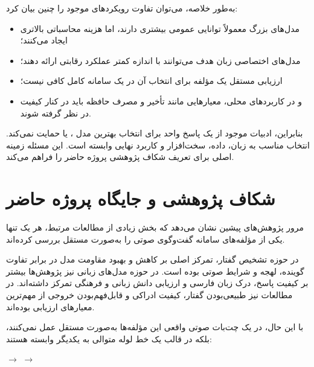به‌طور خلاصه، می‌توان تفاوت رویکردهای موجود را چنین بیان کرد:

\begin{itemize}

    \item مدل‌های بزرگ معمولاً توانایی عمومی بیشتری دارند،
    اما هزینه محاسباتی بالاتری ایجاد می‌کنند؛

    \item مدل‌های اختصاصی زبان هدف می‌توانند با اندازه کمتر
    عملکرد رقابتی ارائه دهند؛

    \item ارزیابی مستقل یک مؤلفه برای انتخاب آن در یک سامانه
    کامل کافی نیست؛

    \item و در کاربردهای محلی، معیارهایی مانند تأخیر و مصرف
    حافظه باید در کنار کیفیت در نظر گرفته شوند.

\end{itemize}

بنابراین، ادبیات موجود از یک پاسخ واحد برای انتخاب بهترین
مدل ،  یا  حمایت نمی‌کند.
انتخاب مناسب به زبان، داده، سخت‌افزار و کاربرد نهایی وابسته
است.
این مسئله زمینه اصلی برای تعریف شکاف پژوهشی پروژه حاضر را
فراهم می‌کند.

\section{شکاف پژوهشی و جایگاه پروژه حاضر}

مرور پژوهش‌های پیشین نشان می‌دهد که بخش زیادی از مطالعات
مرتبط، هر یک تنها یکی از مؤلفه‌های سامانه گفت‌وگوی صوتی را
به‌صورت مستقل بررسی کرده‌اند.

در حوزه تشخیص گفتار، تمرکز اصلی بر کاهش
و بهبود مقاومت مدل در برابر تفاوت گوینده، لهجه و شرایط صوتی
بوده است.
در حوزه مدل‌های زبانی نیز پژوهش‌ها بیشتر بر کیفیت پاسخ،
درک زبان فارسی و ارزیابی دانش زبانی و فرهنگی تمرکز داشته‌اند.
در مطالعات  نیز طبیعی‌بودن گفتار، کیفیت ادراکی و
قابل‌فهم‌بودن خروجی از مهم‌ترین معیارهای ارزیابی بوده‌اند.

با این حال، در یک چت‌بات صوتی واقعی این مؤلفه‌ها به‌صورت
مستقل عمل نمی‌کنند، بلکه در قالب یک خط لوله متوالی به یکدیگر
وابسته هستند:

\begin{center}
$\longrightarrow$
$\longrightarrow$
\end{center}

